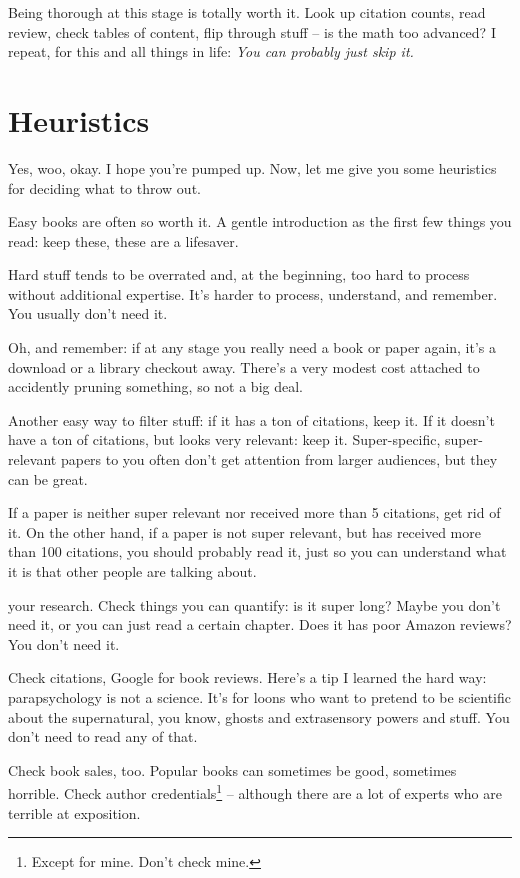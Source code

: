 Being thorough at this stage is totally worth it. Look up citation counts, read
review, check tables of content, flip through stuff -- is the math too advanced?
I repeat, for this and all things in life: \textit{You can probably just skip
  it.}

\section{Heuristics}

Yes, woo, okay. I hope you're pumped up. Now, let me give you some heuristics
for deciding what to throw out.

Easy books are often so worth it. A gentle introduction as the first few things
you read: keep these, these are a lifesaver.

Hard stuff tends to be overrated and, at the beginning, too hard to process
without additional expertise. It's harder to process, understand, and
remember. You usually don't need it.

Oh, and remember: if at any stage you really need a book or paper again, it's a
download or a library checkout away. There's a very modest cost attached to
accidently pruning something, so not a big deal.

Another easy way to filter stuff: if it has a ton of citations, keep it. If it
doesn't have a ton of citations, but looks very relevant: keep
it. Super-specific, super-relevant papers to you often don't get attention from
larger audiences, but they can be great.

If a paper is neither super relevant nor received more than 5 citations, get rid
of it. On the other hand, if a paper is not super relevant, but has received
more than 100 citations, you should probably read it, just so you can understand
what it is that other people are talking about.

 your research. Check things you can quantify: is it
super long? Maybe you don't need it, or you can just read a certain
chapter. Does it has poor Amazon reviews? You don't need it.

Check citations, Google for book reviews. Here's a tip I learned the hard way:
parapsychology is not a science. It's for loons who want to pretend to be
scientific about the supernatural, you know, ghosts and extrasensory powers and
stuff. You don't need to read any of that.

Check book sales, too. Popular books can sometimes be good, sometimes
horrible. Check author credentials\footnote{Except for mine. Don't check mine.} -- although there are a lot of experts who
are terrible at exposition.

